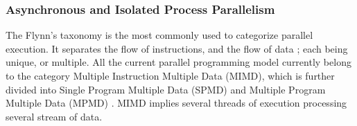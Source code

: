 












\subsubsection{Asynchronous and Isolated Process Parallelism}

The Flynn's taxonomy \cite{Flynn1972} is the most commonly used to categorize parallel execution.
It separates the flow of instructions, and the flow of data ; each being unique, or multiple.
All the current parallel programming model currently belong to the category Multiple Instruction Multiple Data (MIMD), which is further divided into Single Program Multiple Data (SPMD) \cite{Auguin1983,Darema1988,Darema2001} and Multiple Program Multiple Data (MPMD) \cite{Chang1997,Chan2004}.
MIMD implies several threads of execution processing several stream of data.

